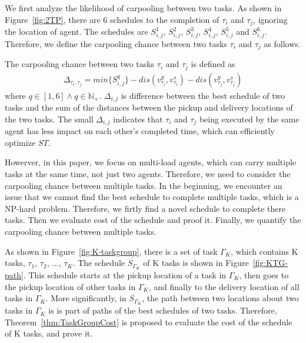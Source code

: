 \documentclass[sigconf,anonymous]{aamas}
\begin{document}
We first analyze the likelihood of carpooling between two tasks.
As shown in Figure~\ref{fig:2TP}, there are 6 schedules to the completion of $\tau_{i}$ and $\tau_{j}$, 
ignoring the location of agent.
The schedules are $S^{1}_{i,j}$, $S^{2}_{i,j}$, $S^{3}_{i,j}$, $S^{4}_{i,j}$, $S^{5}_{i,j}$ and $S^{6}_{i,j}$.
Therefore, we define the carpooling chance between two tasks $\tau_{i}$ and $\tau_{j}$ as follows.

\begin{definition}
\label{cp2}
    The carpooling chance between two tasks $\tau_{i}$ and $\tau_{j}$ is defined as 
    \begin{eqnarray}
    \label{eq:cp2}
        \Delta_{\tau_{i}, \tau_{j}} = min\{S^{q}_{i,j}\} - 
        dis(v^{g}_{\tau_{i}}, v^{s}_{\tau_{i}}) - dis(v^{g}_{\tau_{j}}, v^{s}_{\tau_{j}})
    \end{eqnarray}
    where $q \in [1, 6] \wedge q \in \mathbb{N_+}$. $\Delta_{i,j}$ is difference 
    between the best schedule of two tasks 
    and the sum of the distances between the pickup and delivery locations of the two tasks.
    The small $\Delta_{i,j}$ indicates that $\tau_{i}$ and $\tau_{j}$ being executed by the same agent
    has less impact on each other's completed time, which can efficiently optimize ${ST}$.
\end{definition}

Howerver, in this paper, we focus on multi-load agents, 
which can carry multiple tasks at the same time, not just two agents.
Therefore, we need to consider the carpooling chance between multiple tasks.
In the beginning, we encounter an issue 
that we cannot find the best schedule to complete multiple tasks, 
which is a NP-hard problem.
Therefore, we firtly find a novel schedule to complete there tasks.
Then we evaluate cost of the schedule and proof it.
Finally, we quantify the carpooling chance between multiple tasks.

As shown in Figure~\ref{fig:K-taskgroup}, there is a set of task $\Gamma_K$, 
which contains K tasks, $\tau_{1}$, $\tau_{2}$, ..., $\tau_{K}$.
The schedule $\dot{S_{\Gamma_K}}$ of K tasks is shown in Figure~\ref{fig:KTG-path}.
This schedule starts at the pickup location of a task in $\Gamma_K$, 
then goes to the pickup location of other tasks in $\Gamma_K$, 
and finally to the delivery location of all tasks in $\Gamma_K$.
More significantly, in $\dot{S_{\Gamma_K}}$,
the path between two locations about two tasks in $\Gamma_K$ 
is is part of paths of the best schedules of two tasks.
Therefore, Theorem~\ref{thm:TaskGroupCost} is proposed to evaluate the cost of the schedule of K tasks,
and prove it.
\end{document}
